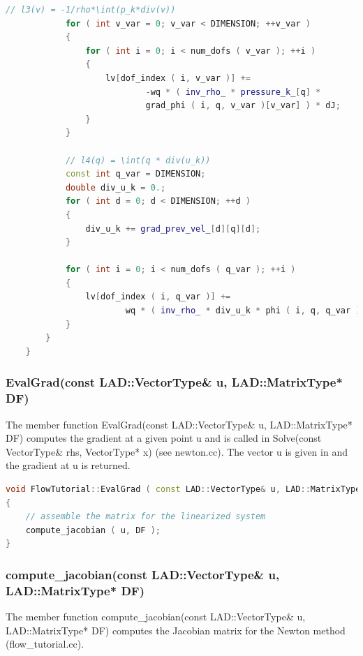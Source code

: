 \documentclass[a4paper, 11pt, twoside]{article}
\begin{document}
\begin{lstlisting}[language=C++, basicstyle={\footnotesize, \ttfamily}, keywordstyle=\color{blue}, numbers=none, tabsize=4]
            // l3(v) = -1/rho*\int(p_k*div(v))
            for ( int v_var = 0; v_var < DIMENSION; ++v_var )
            {
                for ( int i = 0; i < num_dofs ( v_var ); ++i )
                {
                    lv[dof_index ( i, v_var )] +=
                            -wq * ( inv_rho_ * pressure_k_[q] * 
                            grad_phi ( i, q, v_var )[v_var] ) * dJ;
                }
            }

            // l4(q) = \int(q * div(u_k))
            const int q_var = DIMENSION;
            double div_u_k = 0.;
            for ( int d = 0; d < DIMENSION; ++d )
            {
                div_u_k += grad_prev_vel_[d][q][d];
            }

            for ( int i = 0; i < num_dofs ( q_var ); ++i )
            {
                lv[dof_index ( i, q_var )] +=
                        wq * ( inv_rho_ * div_u_k * phi ( i, q, q_var ) ) * dJ;
            }
        }
    }
\end{lstlisting}

\subsubsection{EvalGrad(const LAD::VectorType\& u, LAD::MatrixType* DF)}
The member function EvalGrad(const LAD::VectorType\& u, LAD::MatrixType* DF) computes the gradient at a given point u and is called in Solve(const VectorType\& rhs, VectorType* x) (see newton.cc). The vector u is given in and the gradient at u is returned.

\begin{lstlisting}[language=C++, basicstyle={\footnotesize, \ttfamily}, keywordstyle=\color{blue},  numbers=none, tabsize=4]
void FlowTutorial::EvalGrad ( const LAD::VectorType& u, LAD::MatrixType* DF )
{
    // assemble the matrix for the linearized system
    compute_jacobian ( u, DF );
}
\end{lstlisting}

\subsubsection{compute\_jacobian(const LAD::VectorType\& u, LAD::MatrixType* DF)}
The member function compute\_jacobian(const LAD::VectorType\& u, LAD::MatrixType* DF) computes the Jacobian matrix for the Newton method (flow\_tutorial.cc).
\end{document}
